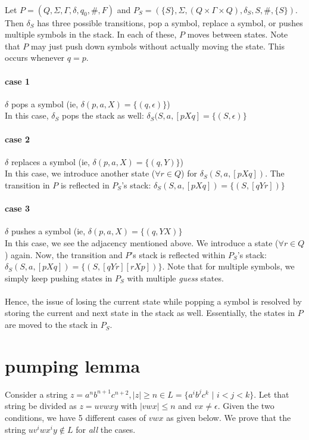 \documentclass[11pt,letterpaper]{article}
\begin{document}
\paragraph{} Let $P = (Q, \Sigma, \Gamma, \delta, q_0, \#, F)$ and $P_S = (\{S\},\Sigma, (Q \times \Gamma \times Q), \delta_S, S, \#, \{S\})$. Then $\delta_S$ has three possible transitions, pop a symbol, replace a symbol, or pushes multiple symbols in the stack. In each of these, $P$ moves between states. Note that $P$ may just push down symbols without actually moving the state. This occurs whenever $q=p$.

\paragraph{case 1} $\delta$ pops a symbol (ie, $\delta(p,a,X) = \{(q,\epsilon)\}$) \\
In this case, $\delta_S$ pops the stack as well: $\delta_S(S,a,[pXq] = \{(S,\epsilon)\}$

\paragraph{case 2} $\delta$ replaces a symbol (ie, $\delta(p,a,X) = \{(q,Y)\}$) \\
In this case, we introduce another state ($\forall r \in Q$) for $\delta_S(S,a,[pXq])$. The transition in $P$ is reflected in $P_S$'s stack: $\delta_S(S,a,[pXq]) = \{(S,[qYr])\}$

\paragraph{case 3} $\delta$ pushes a symbol (ie, $\delta(p,a,X) = \{(q,YX)\}$ \\
In this case, we see the adjacency mentioned above. We introduce a state ($\forall r \in Q$) again. Now, the transition and $P$'s stack is reflected within $P_S$'s stack: $\delta_S(S,a,[pXq]) = \{(S,[qYr][rXp])\}$. Note that for multiple symbols, we simply keep pushing states in $P_S$ with multiple \textit{guess} states.

\paragraph{} Hence, the issue of losing the current state while popping a symbol is resolved by storing the current and next state in the stack as well. Essentially, the states in $P$ are moved to the stack in $P_S$.

\section{pumping lemma}
Consider a string $z = a^n b^{n+1} c^{n+2}, |z| \geq n \in L = \{a^i b^j c^k$ $|$ $i < j < k\}$. Let that string be divided as $z = uvwxy$ with $|vwx| \leq n$ and $vx \neq \epsilon$. Given the two conditions, we have 5 different cases of $vwx$ as given below. We prove that the string $uv^iwx^iy \notin L$ for \textit{all} the cases.
\end{document}
